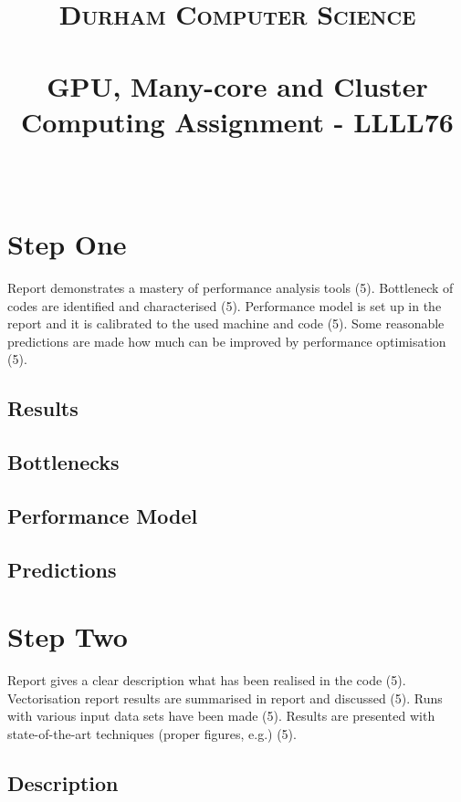 \documentclass[paper=a4, fontsize=11pt]{scrartcl}
\date{}
\title{
		\vspace{-1in} 	
		\usefont{OT1}{bch}{b}{n}
		\normalfont \normalsize \textsc{Durham Computer Science} \\ [5pt]
		\horrule{0.5pt} \\[0.4cm]
		\huge  GPU, Many-core and Cluster Computing Assignment - LLLL76\\
		\horrule{2pt} \\[0.5cm]
		\vspace{-1in} 	
}
\numberwithin{equation}{section}		%
\numberwithin{figure}{section}			%
\numberwithin{table}{section}				%
\begin{document}
\maketitle
\section{Step One}
Report demonstrates a mastery of performance analysis tools (5). Bottleneck of codes are identified and characterised (5). Performance model is set up in the report and it is calibrated to the used machine and code (5). Some reasonable predictions are made how much can be improved by performance optimisation (5).
\subsection{Results}

\subsection{Bottlenecks}

\subsection{Performance Model}

\subsection{Predictions}


\section{Step Two}
Report gives a clear description what has been realised in the code (5). Vectorisation report results are summarised in report and discussed (5). Runs with various input data sets have been made (5). Results are presented with state-of-the-art techniques (proper figures, e.g.) (5).
\subsection{Description}
\end{document}
